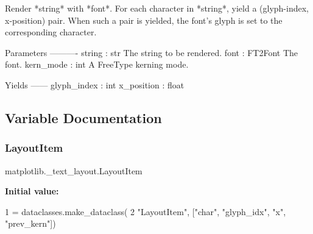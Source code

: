 \begin{DoxyVerb}Render *string* with *font*.  For each character in *string*, yield a
(glyph-index, x-position) pair.  When such a pair is yielded, the font's
glyph is set to the corresponding character.

Parameters
----------
string : str
    The string to be rendered.
font : FT2Font
    The font.
kern_mode : int
    A FreeType kerning mode.

Yields
------
glyph_index : int
x_position : float
\end{DoxyVerb}
 

\subsection{Variable Documentation}
\mbox{\label{namespacematplotlib_1_1__text__layout_a78dfba3922ceb65ef13eca17b681de6e}} 
\subsubsection{\texorpdfstring{Layout\+Item}{LayoutItem}}
{\footnotesize\ttfamily matplotlib.\+\_\+text\+\_\+layout.\+Layout\+Item}

{\bfseries Initial value\+:}
\begin{DoxyCode}
1 =  dataclasses.make\_dataclass(
2     \textcolor{stringliteral}{"LayoutItem"}, [\textcolor{stringliteral}{"char"}, \textcolor{stringliteral}{"glyph\_idx"}, \textcolor{stringliteral}{"x"}, \textcolor{stringliteral}{"prev\_kern"}])
\end{DoxyCode}
